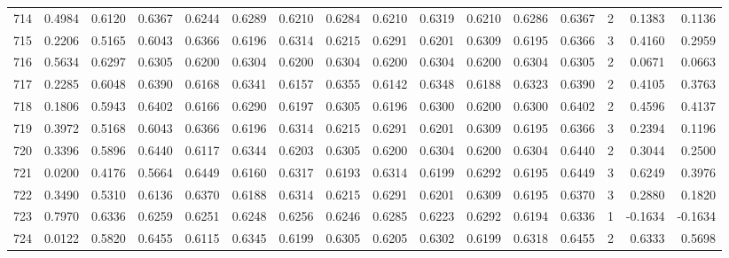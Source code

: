 \begin{tabular}{lrrrrrrrrrrrrrrr}
714 &      0.4984 &  0.6120 &  0.6367 &  0.6244 &  0.6289 &  0.6210 &  0.6284 &  0.6210 &  0.6319 &  0.6210 &   0.6286 &     0.6367 &      2 &                    0.1383 &                     0.1136 \\
715 &      0.2206 &  0.5165 &  0.6043 &  0.6366 &  0.6196 &  0.6314 &  0.6215 &  0.6291 &  0.6201 &  0.6309 &   0.6195 &     0.6366 &      3 &                    0.4160 &                     0.2959 \\
716 &      0.5634 &  0.6297 &  0.6305 &  0.6200 &  0.6304 &  0.6200 &  0.6304 &  0.6200 &  0.6304 &  0.6200 &   0.6304 &     0.6305 &      2 &                    0.0671 &                     0.0663 \\
717 &      0.2285 &  0.6048 &  0.6390 &  0.6168 &  0.6341 &  0.6157 &  0.6355 &  0.6142 &  0.6348 &  0.6188 &   0.6323 &     0.6390 &      2 &                    0.4105 &                     0.3763 \\
718 &      0.1806 &  0.5943 &  0.6402 &  0.6166 &  0.6290 &  0.6197 &  0.6305 &  0.6196 &  0.6300 &  0.6200 &   0.6300 &     0.6402 &      2 &                    0.4596 &                     0.4137 \\
719 &      0.3972 &  0.5168 &  0.6043 &  0.6366 &  0.6196 &  0.6314 &  0.6215 &  0.6291 &  0.6201 &  0.6309 &   0.6195 &     0.6366 &      3 &                    0.2394 &                     0.1196 \\
720 &      0.3396 &  0.5896 &  0.6440 &  0.6117 &  0.6344 &  0.6203 &  0.6305 &  0.6200 &  0.6304 &  0.6200 &   0.6304 &     0.6440 &      2 &                    0.3044 &                     0.2500 \\
721 &      0.0200 &  0.4176 &  0.5664 &  0.6449 &  0.6160 &  0.6317 &  0.6193 &  0.6314 &  0.6199 &  0.6292 &   0.6195 &     0.6449 &      3 &                    0.6249 &                     0.3976 \\
722 &      0.3490 &  0.5310 &  0.6136 &  0.6370 &  0.6188 &  0.6314 &  0.6215 &  0.6291 &  0.6201 &  0.6309 &   0.6195 &     0.6370 &      3 &                    0.2880 &                     0.1820 \\
723 &      0.7970 &  0.6336 &  0.6259 &  0.6251 &  0.6248 &  0.6256 &  0.6246 &  0.6285 &  0.6223 &  0.6292 &   0.6194 &     0.6336 &      1 &                   -0.1634 &                    -0.1634 \\
724 &      0.0122 &  0.5820 &  0.6455 &  0.6115 &  0.6345 &  0.6199 &  0.6305 &  0.6205 &  0.6302 &  0.6199 &   0.6318 &     0.6455 &      2 &                    0.6333 &                     0.5698 \\

\end{tabular}
